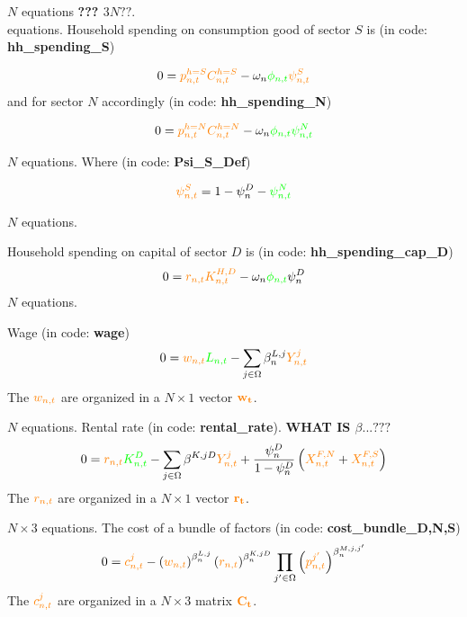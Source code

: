\documentclass[12pt, bibtotoc, tablecaptionabove, figurecaptionabove, fleqn]{article}
\newcommand{\cl}[1]{{\color{orange}{#1}}}
\newcommand{\st}[1]{{\color{green}{#1}}}
\begin{document}
\noindent $N$ equations {\bf{??? $3N??$}}.\\

 equations. Household spending on consumption good of sector $S$ is (in code: {\bf{hh\_spending\_S}}) 

\begin{equation}
0 = \cl{p^{h=S}_{n,t}} \cl{C^{h=S}_{n,t}} - \omega_n \st{\phi_{n,t}} \cl{\psi_{n,t}^S}
\end{equation}
and for sector $N$ accordingly (in code: {\bf{hh\_spending\_N}})

\begin{equation}
0 = \cl{p^{h=N}_{n,t}} \cl{C^{h=N}_{n,t}} - \omega_n \st{\phi_{n,t}} \st{\psi_{n,t}^N}
\end{equation}

\noindent $N $ equations. Where (in code: {\bf{Psi\_S\_Def}})

\begin{equation}
\cl{\psi_{n,t}^S} = 1 - \psi^D_n - \st{\psi_{n,t}^N}
\end{equation}

\noindent $N $ equations. 

Household spending on capital of sector $D$ is (in code: {\bf{hh\_spending\_cap\_D}})
\begin{equation}
0 = \cl{r_{n, t}} \cl{K_{n, t}^{H,D}} - \omega_n \st{\phi_{n,t}} \psi^D_n
\end{equation}
\noindent $N $ equations. 

Wage (in code: {\bf{wage}})
\begin{equation}
0 = \cl{w_{n, t}} \st{L_{n, t}} -\sum_{j \in \Omega} \beta_{n}^{L, j} \cl{Y_{n, t}^{j}}
\end{equation}
The $\cl{w_{n,t}}$ are organized in a $ N \times 1$ vector $\mathbf{\cl{w_t}}$.


\noindent $N$ equations. Rental rate  (in code: {\bf{rental\_rate}}). {\bf{WHAT IS $\beta ...???$}}
\begin{equation}
  0 = \cl{r_{n, t}} \st{K_{n, t}^{D}}-\sum_{j \in \Omega} \beta^{K, j D} \cl{Y_{n, t}^{j}}+\frac{\psi^{D}_n} { 1-\psi^D_n }\left(\cl{X_{n, t}^{F, N}}+\cl{X_{n, t}^{F, S}}\right)
\end{equation}
The $\cl{r_{n,t}}$ are organized in a $ N \times 1$ vector $\mathbf{\cl{r_t}}$.

\noindent $N \times 3$ equations. The cost of a bundle of factors (in code: {\bf{cost\_bundle\_D,N,S}})
\begin{equation}
0 = \cl{c_{n, t}^{j}}-\left(\cl{w_{n, t}}\right)^{\beta_{n}^{L, j}}\left(\cl{r_{n, t}}\right)^{\beta_{n}^{K, j D}} \prod_{j^{\prime} \in \Omega}\left(\cl{p_{n, t}^{j^{\prime}}}\right)^{\beta_{n}^{M, j,j^{\prime}}}
\end{equation}
The $\cl{c^j_{n,t}}$ are organized in a $ N \times 3$ matrix $\mathbf{\cl{C_t}}$.
\end{document}
